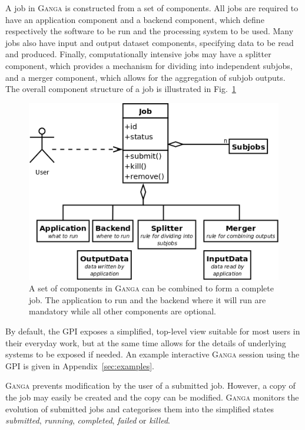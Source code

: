 \documentclass{elsart}
\def\ganga {\textsc{Ganga}\xspace}
\def\GPI{GPI\xspace}
\newcommand{\val}[1]{\emph{#1}}
\begin{document}
A job in \ganga is constructed from a set of components. All jobs are
required to have an application component and a backend component, which
define respectively the software to be run and the processing system to be
used.  Many jobs also have input and output dataset components,
specifying data to be read and produced.  Finally, computationally intensive
jobs may have a splitter component, which provides a mechanism for dividing
into independent subjobs, and a merger component, which allows for the
aggregation of subjob outputs. The overall component structure of a job is
illustrated in Fig.~\ref{fig:JobComponents}
\begin{figure}
  \centering
  \includegraphics[width=14cm]{job-uml.png}
  \caption{A set of components in \ganga can be combined to form a complete
    job. The application to run and the backend where it will run are
    mandatory while all other components are optional.}
  \label{fig:JobComponents}
\end{figure}

By default, the \GPI exposes a simplified, top-level view suitable for most
users in their everyday work, but at the same time allows for the details of
underlying systems to be exposed if needed. An example interactive \ganga
session using the GPI is given in Appendix~\ref{sec:examples}.

\ganga prevents modification by the user of a submitted job.  However,
a copy of the job may easily be created and the copy can be modified.
\ganga monitors the evolution of submitted jobs and categorises
them into the simplified states \val{submitted}, \val{running},
\val{completed}, \val{failed} or \val{killed}.
\end{document}
